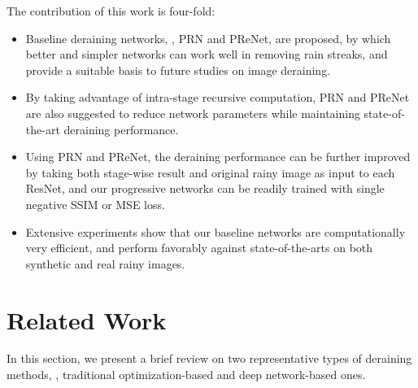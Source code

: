 \documentclass[10pt,twocolumn,letterpaper]{article}
\begin{document}
The contribution of this work is four-fold:
\begin{itemize}
\vspace{-0.06in}
\item Baseline deraining networks, \ie, PRN and PReNet, are proposed, by which better and simpler networks can work well in removing rain streaks, and provide a suitable basis to future studies on image deraining.
\vspace{-0.06in}
\item By taking advantage of intra-stage recursive computation, PRN and PReNet are also suggested to reduce network parameters while maintaining state-of-the-art deraining performance.
\vspace{-0.06in}
\item Using PRN and PReNet, the deraining performance can be further improved by taking both stage-wise result and original rainy image as input to each ResNet, and our progressive networks can be readily trained with single negative SSIM or MSE loss.
\vspace{-0.06in}
\item Extensive experiments show that our baseline networks are computationally very efficient, and perform favorably against state-of-the-arts on both synthetic and real rainy images.
\end{itemize}












\section{Related Work}\label{sec:related_work}
In this section, we present a brief review on two representative types of deraining methods, \ie, traditional optimization-based and deep network-based ones.
\end{document}
